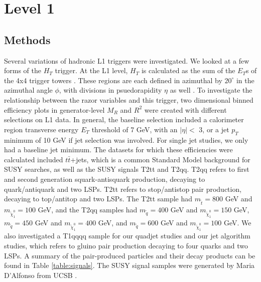 \documentclass[twocolumn,aps,prd,reprint]{revtex4-1}
\begin{document}
\section{Level 1}
\subsection{Methods}
Several variations of hadronic L1 triggers were investigated. We looked at a few forms of the $H_T$ trigger. At the L1 level, $H_T$ is calculated as the sum of the $E_T$s of the 4x4 trigger towers \cite{ucsb}.  These regions are each defined in azimuthal by $20^{\circ}$ in the azimuthal angle $\phi$, with divisions in psuedorapidity $\eta$ as well \cite{hlt}. To investigate the relationship between the razor variables and this trigger, two dimensional binned efficiency plots in generator-level $M_{R}$ and $R^2$ were created with different selections on L1 data. In general, the baseline selection included a calorimeter region transverse energy $E_T$ threshold of 7 GeV, with an $|\eta| <$  3, or a jet $p_T$ minimum of 10 GeV if jet selection was involved. For single jet studies, we only had a baseline jet minimum. The datasets for which these efficiencies were calculated included $t\bar{t}$+jets, which is a common Standard Model background for SUSY searches, as well as the SUSY signals T2tt and T2qq. T2qq refers to first and second generation squark-antisquark production, decaying to quark/antiquark and two LSPs. T2tt refers to stop/antistop pair production, decaying to top/antitop and two LSPs. The T2tt sample had $m_{\tilde{t}}=800$ GeV and $m_{\tilde{\chi}^0_1}=100$ GeV, and the T2qq samples had $m_{\tilde{q}}=400$ GeV and $m_{\tilde{\chi}^0_1}=150$ GeV, $m_{\tilde{q}}=450$ GeV and $m_{\tilde{\chi}^0_1}=400$ GeV, and $m_{\tilde{q}}=600$ GeV and $m_{\tilde{\chi}^0_1}=100$ GeV. We also investigated a T1qqqq sample for our quadjet studies and our jet algorithm studies, which refers to gluino pair production decaying to four quarks and two LSPs. A summary of the pair-produced particles and their decay products can be found in Table \ref{table:signals}. The SUSY signal samples were generated by Maria D'Alfonso from UCSB \cite{ucsb}. 
\end{document}
